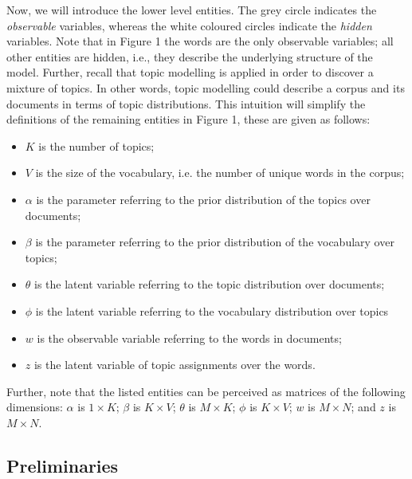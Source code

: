 \documentclass{mprop}
\begin{document}
\par Now, we will introduce the lower level entities. The grey circle indicates the \textit{observable} variables, whereas the white coloured circles indicate the \textit{hidden} variables. Note that in Figure 1 the words are the only observable variables; all other entities are hidden, i.e., they describe the underlying structure of the model. Further, recall that topic modelling is applied in order to discover a mixture of topics. In other words, topic modelling could describe a corpus and its documents in terms of topic distributions. This intuition will simplify the definitions of the remaining entities in Figure 1, these are given as follows:
\begin{itemize}
\item $K$ is the number of topics;
\item $V$ is the size of the vocabulary, i.e. the number of unique words in the corpus;
\item $\alpha$ is the parameter referring to the prior distribution of the topics over documents;
\item $\beta$ is the parameter referring to the prior distribution of the vocabulary over topics;
\item $\theta$ is the latent variable referring to the topic distribution over documents;
\item $\phi$ is the latent variable referring to the vocabulary distribution over topics
\item $w$ is the observable variable referring to the words in documents;
\item $z$ is the latent variable of topic assignments over the words.
\end{itemize}
Further, note that the listed entities can be perceived as matrices of the following dimensions: $\alpha$ is $1 \times K$; $\beta$ is $K \times V$; $\theta$ is $M \times K$; $\phi$ is $K \times V$; $w$ is $M \times N$; and $z$ is $M \times N$.

\subsection{Preliminaries}
\end{document}
